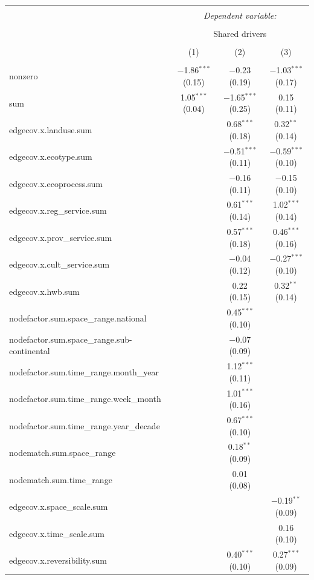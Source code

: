 \documentclass[9pt,]{article}
\begin{document}
\begin{tabular}{@{\extracolsep{5pt}}lccc} 
\\[-1.8ex]\hline 
\hline \\[-1.8ex] 
 & \multicolumn{3}{c}{\textit{Dependent variable:}} \\ 
\cline{2-4} 
\\[-1.8ex] & \multicolumn{3}{c}{Shared drivers} \\ 
\\[-1.8ex] & (1) & (2) & (3)\\ 
\hline \\[-1.8ex] 
 nonzero & $-$1.86$^{***}$ (0.15) & $-$0.23 (0.19) & $-$1.03$^{***}$ (0.17) \\ 
  sum & 1.05$^{***}$ (0.04) & $-$1.65$^{***}$ (0.25) & 0.15 (0.11) \\ 
  edgecov.x.landuse.sum &  & 0.68$^{***}$ (0.18) & 0.32$^{**}$ (0.14) \\ 
  edgecov.x.ecotype.sum &  & $-$0.51$^{***}$ (0.11) & $-$0.59$^{***}$ (0.10) \\ 
  edgecov.x.ecoprocess.sum &  & $-$0.16 (0.11) & $-$0.15 (0.10) \\ 
  edgecov.x.reg\_service.sum &  & 0.61$^{***}$ (0.14) & 1.02$^{***}$ (0.14) \\ 
  edgecov.x.prov\_service.sum &  & 0.57$^{***}$ (0.18) & 0.46$^{***}$ (0.16) \\ 
  edgecov.x.cult\_service.sum &  & $-$0.04 (0.12) & $-$0.27$^{***}$ (0.10) \\ 
  edgecov.x.hwb.sum &  & 0.22 (0.15) & 0.32$^{**}$ (0.14) \\ 
  nodefactor.sum.space\_range.national &  & 0.45$^{***}$ (0.10) &  \\ 
  nodefactor.sum.space\_range.sub-continental &  & $-$0.07 (0.09) &  \\ 
  nodefactor.sum.time\_range.month\_year &  & 1.12$^{***}$ (0.11) &  \\ 
  nodefactor.sum.time\_range.week\_month &  & 1.01$^{***}$ (0.16) &  \\ 
  nodefactor.sum.time\_range.year\_decade &  & 0.67$^{***}$ (0.10) &  \\ 
  nodematch.sum.space\_range &  & 0.18$^{**}$ (0.09) &  \\ 
  nodematch.sum.time\_range &  & 0.01 (0.08) &  \\ 
  edgecov.x.space\_scale.sum &  &  & $-$0.19$^{**}$ (0.09) \\ 
  edgecov.x.time\_scale.sum &  &  & 0.16 (0.10) \\ 
  edgecov.x.reversibility.sum &  & 0.40$^{***}$ (0.10) & 0.27$^{***}$ (0.09) \\ 

\end{tabular}
\end{document}
